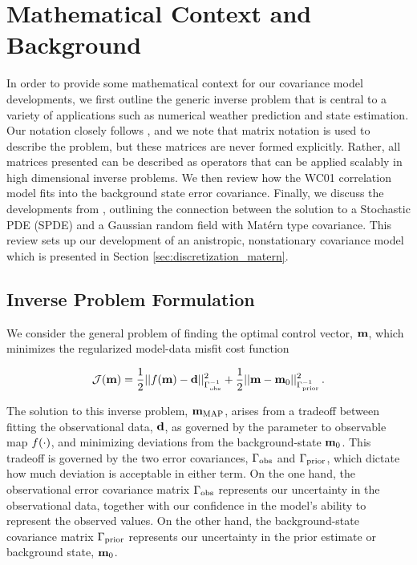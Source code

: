 \section{Mathematical Context and Background}
\label{sec:review}

In order to provide some mathematical context for our covariance model
developments, we first outline the generic inverse problem that is central to
a variety of applications such as numerical weather prediction and state
estimation.
Our notation closely follows \citet{ide_unified_1997}, and we note that matrix
notation is used to describe the problem, but these matrices are never formed
explicitly.
Rather, all matrices presented can be described as operators that can be applied
scalably in high dimensional inverse problems.
We then review how the WC01 correlation model fits into the background state
error covariance.
Finally, we discuss the developments from \citet{RSSB:RSSB777}, outlining the
connection between the solution to a Stochastic PDE (SPDE) and a Gaussian random
field with Mat\'ern type covariance.
This review sets up our development of an anistropic, nonstationary covariance
model which is presented in Section \ref{sec:discretization_matern}.


\subsection{Inverse Problem Formulation}
\label{ssec:da_formulation}

We consider the general problem of finding the optimal control vector,
$\mathbf{m}$, which minimizes the regularized model-data misfit cost function
\begin{linenomath*}\begin{equation*}
    \mathcal{J}(\mathbf{m}) =
        \dfrac{1}{2}||f(\mathbf{m}) - \mathbf{d}||_{\Gamma_\text{obs}^{-1}}^2
        +
        \dfrac{1}{2}||\mathbf{m} - \mathbf{m}_{0}||_{\Gamma_{\text{prior}}^{-1}}^2 \, .
\end{equation*}\end{linenomath*}
The solution to this inverse problem, $\mathbf{m}_{\text{MAP}}$, arises from a tradeoff between fitting the
observational data, $\mathbf{d}$, as governed by the parameter to observable map
$f(\cdot)$, and minimizing deviations from the background-state $\mathbf{m}_{0}$.
This tradeoff is governed by the two error covariances, $\Gamma_\text{obs}$ and
$\Gamma_{\text{prior}}$, which dictate how much deviation is acceptable in either term.
On the one hand, the observational error covariance matrix
$\Gamma_\text{obs}$ represents our uncertainty
in the observational data, together with our confidence in the model's ability
to represent the observed values.
On the other hand, the background-state covariance matrix $\Gamma_{\text{prior}}$
represents our uncertainty in the prior estimate or background state,
$\mathbf{m}_{0}$.

